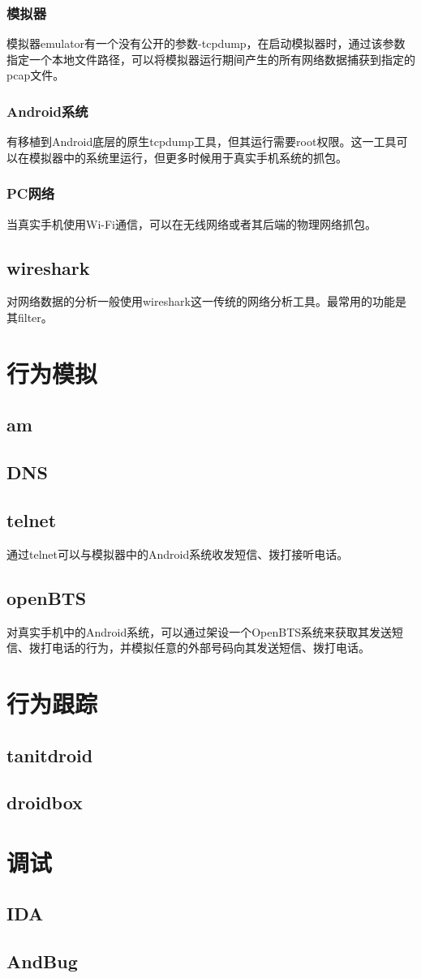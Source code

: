 \subsubsection{模拟器}
模拟器emulator有一个没有公开的参数-tcpdump，在启动模拟器时，通过该参数指定一个本地文件路径，可以将模拟器运行期间产生的所有网络数据捕获到指定的pcap文件。
\subsubsection{Android系统}
有移植到Android底层的原生tcpdump工具，但其运行需要root权限。这一工具可以在模拟器中的系统里运行，但更多时候用于真实手机系统的抓包。
\subsubsection{PC网络}
当真实手机使用Wi-Fi通信，可以在无线网络或者其后端的物理网络抓包。
\subsection{wireshark}
对网络数据的分析一般使用wireshark这一传统的网络分析工具。最常用的功能是其filter。

\section{行为模拟}
\subsection{am}

\subsection{DNS}

\subsection{telnet}
通过telnet可以与模拟器中的Android系统收发短信、拨打接听电话。
\subsection{openBTS}
对真实手机中的Android系统，可以通过架设一个OpenBTS系统来获取其发送短信、拨打电话的行为，并模拟任意的外部号码向其发送短信、拨打电话。

\section{行为跟踪}
\subsection{tanitdroid}
\subsection{droidbox}

\section{调试}
\subsection{IDA}
\subsection{AndBug}